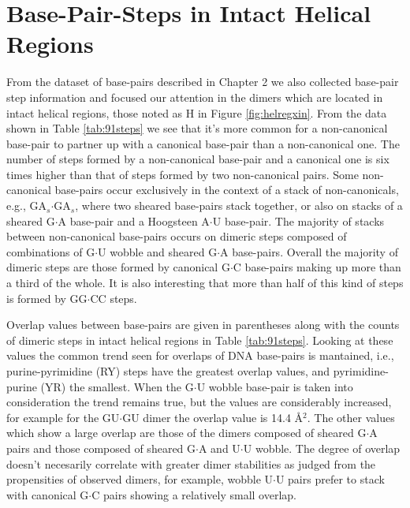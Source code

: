 \section{Base-Pair-Steps in Intact Helical Regions}
From  the  dataset  of  base-pairs  described in  Chapter  2  we  also
collected base-pair step information  and focused our attention in the
dimers which are  located in intact helical regions,  those noted as H
in  Figure   \ref{fig:helregxin}.   From  the  data   shown  in  Table
\ref{tab:91steps}  we see that  it's more  common for  a non-canonical
base-pair   to  partner  up   with  a   canonical  base-pair   than  a
non-canonical  one.  The  number of  steps formed  by  a non-canonical
base-pair and a  canonical one is six times higher  than that of steps
formed  by  two non-canonical  pairs.   Some non-canonical  base-pairs
occur exclusively in  the context of a stack  of non-canonicals, e.g.,
GA$_{s}$$\cdot$GA$_{s}$, where two  sheared base-pairs stack together,
or also  on stacks  of a sheared  G$\cdot$A base-pair and  a Hoogsteen
A$\cdot$U  base-pair.  The  majority of  stacks  between non-canonical
base-pairs  occurs  on  dimeric  steps  composed  of  combinations  of
G$\cdot$U  wobble  and  sheared  G$\cdot$A  base-pairs.   Overall  the
majority  of dimeric  steps are  those formed  by  canonical G$\cdot$C
base-pairs  making up  more than  a third  of the  whole.  It  is also
interesting that  more than half  of this kind  of steps is  formed by
GG$\cdot$CC steps.

Overlap values between base-pairs  are given in parentheses along with
the  counts  of dimeric  steps  in  intact  helical regions  in  Table
\ref{tab:91steps}. Looking  at these values the common  trend seen for
overlaps of DNA base-pairs  is mantained, i.e., purine-pyrimidine (RY)
steps have the greatest overlap values, and pyrimidine-purine (YR) the
smallest.   When   the  G$\cdot$U  wobble  base-pair   is  taken  into
consideration the trend remains  true, but the values are considerably
increased, for example for the  GU$\cdot$GU dimer the overlap value is
14.4 \AA$^{\text{2}}$.   The other values  which show a  large overlap
are those of the dimers  composed of sheared G$\cdot$A pairs and those
composed  of sheared G$\cdot$A  and U$\cdot$U  wobble.  The  degree of
overlap doesn't necesarily correlate with greater dimer stabilities as
judged from  the propensities of observed dimers,  for example, wobble
U$\cdot$U pairs prefer to stack with canonical G$\cdot$C pairs showing
a relatively small overlap.

